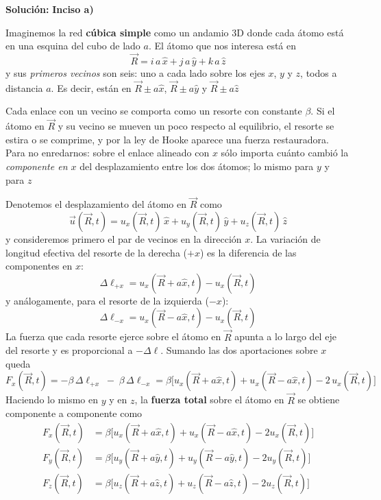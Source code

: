 \documentclass{article}
\begin{document}
\vspace{0.5cm}

\textcolor{Cinnabar}{\textbf{Solución:}}
\textbf{Inciso a)}\;

Imaginemos la red \textbf{cúbica simple} como un andamio 3D donde cada átomo está en una esquina del cubo de lado \(a\). El átomo que nos interesa está en
\[
\vec R = i\,a\,\hat x + j\,a\,\hat y + k\,a\,\hat z
\]
y sus \emph{primeros vecinos} son seis: uno a cada lado sobre los ejes \(x\), \(y\) y \(z\), todos a distancia \(a\). Es decir, están en \(\vec R \pm a\hat x\), \(\vec R \pm a\hat y\) y \(\vec R \pm a\hat z\)

Cada enlace con un vecino se comporta como un resorte con constante \(\beta\). Si el átomo en \(\vec R\) y su vecino se mueven un poco respecto al equilibrio, el resorte se estira o se comprime, y por la ley de Hooke aparece una fuerza restauradora. Para no enredarnos: sobre el enlace alineado con \(x\) sólo importa cuánto cambió la \emph{componente en \(x\)} del desplazamiento entre los dos átomos; lo mismo para \(y\) y para \(z\)

Denotemos el desplazamiento del átomo en \(\vec R\) como
\[
\vec u(\vec R,t)=u_x(\vec R,t)\,\hat x + u_y(\vec R,t)\,\hat y + u_z(\vec R,t)\,\hat z
\]
y consideremos primero el par de vecinos en la dirección \(x\). La variación de longitud efectiva del resorte de la derecha (\(+x\)) es la diferencia de las componentes en \(x\):
\[
\Delta\ell_{+x} = u_x(\vec R{+}a\hat x,t) - u_x(\vec R,t)
\]
y análogamente, para el resorte de la izquierda (\(-x\)):
\[
\Delta\ell_{-x} = u_x(\vec R{-}a\hat x,t) - u_x(\vec R,t)
\]
La fuerza que cada resorte ejerce sobre el átomo en \(\vec R\) apunta a lo largo del eje del resorte y es proporcional a \(-\Delta\ell\). Sumando las dos aportaciones sobre \(x\) queda
\[
F_x(\vec R,t)= -\beta\,\Delta\ell_{+x} \;-\; \beta\,\Delta\ell_{-x}
= \beta\Big[u_x(\vec R{+}a\hat x,t) + u_x(\vec R{-}a\hat x,t) - 2\,u_x(\vec R,t)\Big]
\]
Haciendo lo mismo en \(y\) y en \(z\), la \textbf{fuerza total} sobre el átomo en \(\vec R\) se obtiene componente a componente como
\begin{equation}
\boxed{
\begin{aligned}
F_x(\vec R,t)&=\beta\Big[u_x(\vec R{+}a\hat x,t)+u_x(\vec R{-}a\hat x,t)-2u_x(\vec R,t)\Big]\\
F_y(\vec R,t)&=\beta\Big[u_y(\vec R{+}a\hat y,t)+u_y(\vec R{-}a\hat y,t)-2u_y(\vec R,t)\Big]\\
F_z(\vec R,t)&=\beta\Big[u_z(\vec R{+}a\hat z,t)+u_z(\vec R{-}a\hat z,t)-2u_z(\vec R,t)\Big]
\end{aligned}}
\label{eq:fuerza_componentes_rcs}
\end{equation}
\end{document}

